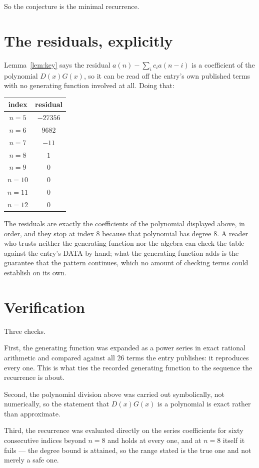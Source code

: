 \documentclass[11pt,a4paper]{article}
\theoremstyle{plain}
\theoremstyle{definition}
\begin{document}
So the conjecture is the minimal recurrence.

\section{The residuals, explicitly}

Lemma~\ref{lem:key} says the residual $a(n)-\sum_ic_ia(n-i)$ is a coefficient of the
polynomial $D(x)G(x)$, so it can be read off the entry's own published terms with no
generating function involved at all. Doing that:
\begin{center}
\begin{tabular}{cc}
index & residual \\ \hline
$n=5$ & $-27356$ \\
$n=6$ & $9682$ \\
$n=7$ & $-11$ \\
$n=8$ & $1$ \\
$n=9$ & $0$ \\
$n=10$ & $0$ \\
$n=11$ & $0$ \\
$n=12$ & $0$
\end{tabular}
\end{center}
The residuals are exactly the coefficients of the polynomial displayed above, in order, and
they stop at index $8$ because that polynomial has degree $8$. A reader who trusts
neither the generating function nor the algebra can check the table against the entry's DATA
by hand; what the generating function adds is the guarantee that the pattern continues, which
no amount of checking terms could establish on its own.

\section{Verification}

Three checks.

First, the generating function was expanded as a power series in exact rational arithmetic and
compared against all $26$ terms the entry publishes: it reproduces every one. This is
what ties the recorded generating function to the sequence the recurrence is about.

Second, the polynomial division above was carried out symbolically, not numerically, so the
statement that $D(x)G(x)$ is a polynomial is exact rather than approximate.

Third, the recurrence was evaluated directly on the series coefficients for sixty consecutive
indices beyond $n=8$ and holds at every one, and at $n=8$ itself it fails --- the
degree bound is attained, so the range stated is the true one and not merely a safe one.
\end{document}
